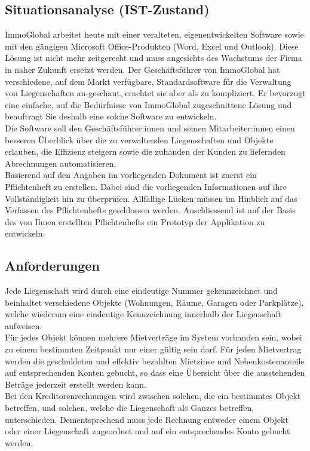 \subsection{Situationsanalyse (IST-Zustand)}
ImmoGlobal arbeitet heute mit einer veralteten, eigenentwickelten Software sowie mit den gängigen Microsoft Office-Produkten (Word, Excel und Outlook). Diese Lösung ist nicht mehr zeitgerecht und muss angesichts des Wachstums der Firma in naher Zukunft ersetzt werden. Der Geschäftsführer von ImmoGlobal hat verschiedene, auf dem Markt verfügbare, Standardsoftware für die Verwaltung von Liegenschaften an-geschaut, erachtet sie aber als zu kompliziert. Er bevorzugt eine einfache, auf die Bedürfnisse von ImmoGlobal zugeschnittene Lösung und beauftragt Sie deshalb eine solche Software zu entwickeln.\\
Die Software soll den Geschäftsführer:innen und seinen Mitarbeiter:innen einen besseren Überblick über die zu verwaltenden Liegenschaften und Objekte erlauben, die Effizienz steigern sowie die zuhanden der Kunden zu liefernden Abrechnungen automatisieren.\\
Basierend auf den Angaben im vorliegenden Dokument ist zuerst ein Pflichtenheft zu erstellen. Dabei sind die vorliegenden Informationen auf ihre Vollständigkeit hin zu überprüfen. Allfällige Lücken müssen im Hinblick auf das Verfassen des Pflichtenhefts geschlossen werden. Anschliessend ist auf der Basis des von Ihnen erstellten Pflichtenhefts ein Prototyp der Applikation zu entwickeln.

\subsection{Anforderungen}
Jede Liegenschaft wird durch eine eindeutige Nummer gekennzeichnet und beinhaltet verschiedene Objekte (Wohnungen, Räume, Garagen oder Parkplätze), welche wiederum eine eindeutige Kennzeichnung innerhalb der Liegenschaft aufweisen.\\
Für jedes Objekt können mehrere Mietverträge im System vorhanden sein, wobei zu einem bestimmten Zeitpunkt nur einer gültig sein darf. Für jeden Mietvertrag werden die geschuldeten und effektiv bezahlten Mietzinse und Nebenkostenanteile auf entsprechenden Konten gebucht, so dass eine Übersicht über die ausstehenden Beträge jederzeit erstellt werden kann.\\
Bei den Kreditorenrechnungen wird zwischen solchen, die ein bestimmtes Objekt betreffen, und solchen, welche die Liegenschaft als Ganzes betreffen, unterschieden. Dementsprechend muss jede Rechnung entweder einem Objekt oder einer Liegenschaft zugeordnet und auf ein entsprechendes Konto gebucht werden.\\

